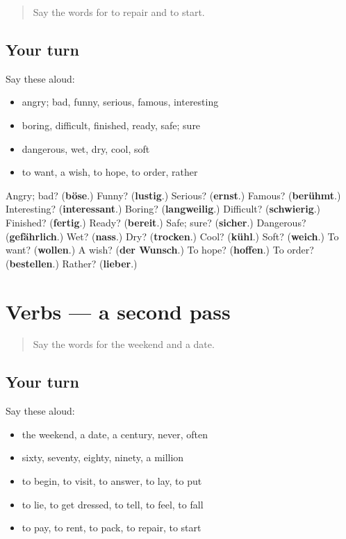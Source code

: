 \begin{quote}
Say the words for to repair and to start.
\end{quote}

\subsection*{Your turn}
Say these aloud:

\begin{itemize}
\raggedright
  \item angry; bad, funny, serious, famous, interesting
  \item boring, difficult, finished, ready, safe; sure
  \item dangerous, wet, dry, cool, soft
  \item to want, a wish, to hope, to order, rather
\end{itemize}

\begin{tcolorbox}[breakable,colback=teal!4,colframe=teal!35!black,title={Before you move on}]
Angry; bad? (\textbf{böse}.) Funny? (\textbf{lustig}.) Serious? (\textbf{ernst}.) Famous? (\textbf{berühmt}.) Interesting? (\textbf{interessant}.) Boring? (\textbf{langweilig}.) Difficult? (\textbf{schwierig}.) Finished? (\textbf{fertig}.) Ready? (\textbf{bereit}.) Safe; sure? (\textbf{sicher}.) Dangerous? (\textbf{gefährlich}.) Wet? (\textbf{nass}.) Dry? (\textbf{trocken}.) Cool? (\textbf{kühl}.) Soft? (\textbf{weich}.) To want? (\textbf{wollen}.) A wish? (\textbf{der Wunsch}.) To hope? (\textbf{hoffen}.) To order? (\textbf{bestellen}.) Rather? (\textbf{lieber}.)
\end{tcolorbox}
\section[(dialogue)]{Verbs — a second pass}

\label{lesson:GE-R141-second-pass-verbs}



\begin{quote}
Say the words for the weekend and a date.
\end{quote}

\subsection*{Your turn}
Say these aloud:

\begin{itemize}
\raggedright
  \item the weekend, a date, a century, never, often
  \item sixty, seventy, eighty, ninety, a million
  \item to begin, to visit, to answer, to lay, to put
  \item to lie, to get dressed, to tell, to feel, to fall
  \item to pay, to rent, to pack, to repair, to start
\end{itemize}

